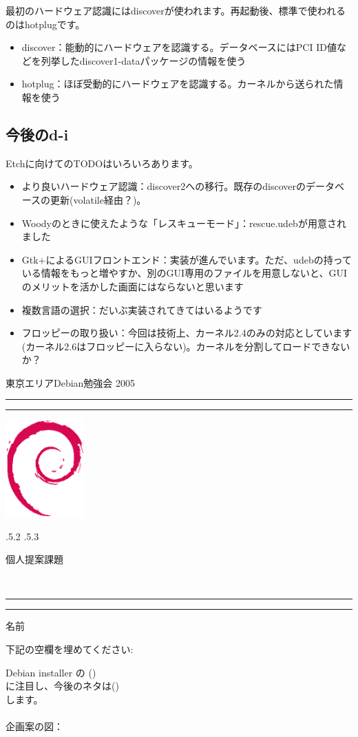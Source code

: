 \documentclass[mingoth]{jsarticle}
\makeatletter
\renewcommand{\section}{\@startsection{section}{1}{\z@}%
    {\Cvs \@plus.5\Cdp \@minus.2\Cdp}%
    {.5\Cvs \@plus.3\Cdp}%
    {\normalfont\Large\headfont\raggedright\centering}} %
\newcommand{\dancersection}[2]{%
\newpage
東京エリアDebian勉強会 2005
\hrule
\vspace{0.5mm}
\hrule
\hfill{}\includegraphics[width=3cm]{image200502/openlogo-nd.eps}\\
\vspace{-4cm}
\begin{center}
  \section{#1}
\end{center}
\hfill{}#2\hspace{3cm}\space\\
\hrule
\hrule
\vspace{1cm}
}
\makeatother
\begin{document}
最初のハードウェア認識にはdiscoverが使われます。再起動後、標準で使われるのはhotplugです。

\begin{itemize}
\item discover：能動的にハードウェアを認識する。データベースにはPCI ID値などを列挙したdiscover1-dataパッケージの情報を使う
\item hotplug：ほぼ受動的にハードウェアを認識する。カーネルから送られた情報を使う
\end{itemize}


\subsection{今後のd-i}
\label{sec:di}

Etchに向けてのTODOはいろいろあります。

\begin{itemize}
\item より良いハードウェア認識：discover2への移行。既存のdiscoverのデータベースの更新(volatile経由？)。
\item Woodyのときに使えたような「レスキューモード」：rescue.udebが用意されました
\item Gtk+によるGUIフロントエンド：実装が進んでいます。ただ、udebの持っている情報をもっと増やすか、別のGUI専用のファイルを用意しないと、GUIのメリットを活かした画面にはならないと思います
\item 複数言語の選択：だいぶ実装されてきてはいるようです
\item フロッピーの取り扱い：今回は技術上、カーネル2.4のみの対応としています(カーネル2.6はフロッピーに入らない)。カーネルを分割してロードできないか？
\end{itemize}

\newpage

\dancersection{個人提案課題}{}
\hfill{}{\large 名前} \underline{\hspace{6cm}}

下記の空欄を埋めてください:

{\LARGE 
Debian installer の (\hspace{5cm})\\
に注目し、今後のネタは(\hspace{6cm})\\
します。
}
\\\\
企画案の図：

\newpage
\end{document}
